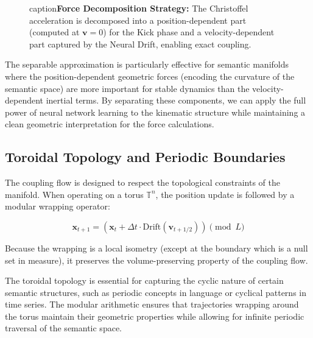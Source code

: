 \documentclass[12pt,a4paper]{article}
\begin{document}
\begin{figure}[htbp]
caption{\textbf{Force Decomposition Strategy:} The Christoffel acceleration 
         is decomposed into a position-dependent part (computed at $\mathbf{v}=0$) 
         for the Kick phase and a velocity-dependent part captured by the 
         Neural Drift, enabling exact coupling.}
\label{fig:force_decomposition}
\end{figure}

The separable approximation is particularly effective for semantic manifolds where the position-dependent geometric forces (encoding the curvature of the semantic space) are more important for stable dynamics than the velocity-dependent inertial terms. By separating these components, we can apply the full power of neural network learning to the kinematic structure while maintaining a clean geometric interpretation for the force calculations.

\subsection{Toroidal Topology and Periodic Boundaries}

The coupling flow is designed to respect the topological constraints of the manifold. When operating on a torus $\mathbb{T}^n$, the position update is followed by a modular wrapping operator:

\begin{equation}
\mathbf{x}_{t+1} = (\mathbf{x}_t + \Delta t \cdot \text{Drift}(\mathbf{v}_{t+1/2})) \pmod L
\end{equation}

Because the wrapping is a local isometry (except at the boundary which is a null set in measure), it preserves the volume-preserving property of the coupling flow.

The toroidal topology is essential for capturing the cyclic nature of certain semantic structures, such as periodic concepts in language or cyclical patterns in time series. The modular arithmetic ensures that trajectories wrapping around the torus maintain their geometric properties while allowing for infinite periodic traversal of the semantic space.
\end{document}
